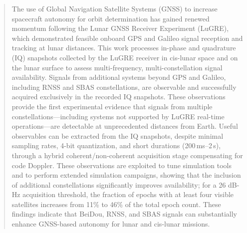 \documentclass{IEEEtaes}
\begin{document}
\begin{abstract}

The use of Global Navigation Satellite Systems (GNSS) to increase spacecraft autonomy for orbit determination has gained renewed momentum following the Lunar GNSS Receiver Experiment (LuGRE), which demonstrated feasible onboard GPS and Galileo signal reception and tracking at lunar distances. This work processes in-phase and quadrature (IQ) snapshots collected by the LuGRE receiver in cis-lunar space and on the lunar surface to assess multi-frequency, multi-constellation signal availability. 
Signals from additional systems beyond GPS and Galileo, including RNSS and SBAS constellations, are observable and successfully acquired exclusively in the recorded IQ snapshots.
These observations provide the first experimental evidence that signals from multiple constellations—including systems not supported by LuGRE real-time operations—are detectable at unprecedented distances from Earth. Useful observables can be extracted from the IQ snapshots, despite minimal sampling rates, 4-bit quantization, and short durations (200\,ms–2\,s), through a hybrid coherent/non-coherent acquisition stage compensating for code Doppler.
These observations are exploited to tune simulation tools and to perform extended simulation campaigns,  %
showing that the inclusion of additional constellations significantly improves availability; for a 26 dB-Hz acquisition threshold, the fraction of epochs with at least four visible satellites increases from 11\% to 46\% of the total epoch count.
These findings indicate that BeiDou, RNSS, and SBAS signals can substantially enhance GNSS-based autonomy for lunar and cis-lunar missions.
\end{abstract}
\end{document}
